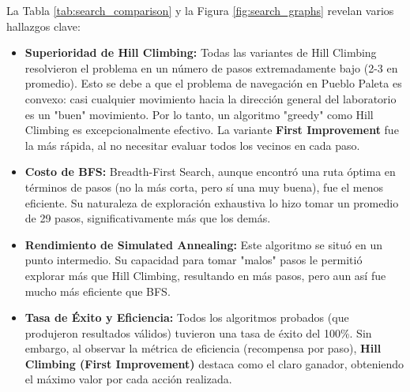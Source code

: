 \documentclass[12pt, oneside, openany]{book}
\begin{document}


La Tabla \ref{tab:search_comparison} y la Figura \ref{fig:search_graphs} revelan varios hallazgos clave:
\begin{itemize}
    \item \textbf{Superioridad de Hill Climbing:} Todas las variantes de Hill Climbing resolvieron el problema en un número de pasos extremadamente bajo (2-3 en promedio). Esto se debe a que el problema de navegación en Pueblo Paleta es convexo: casi cualquier movimiento hacia la dirección general del laboratorio es un "buen" movimiento. Por lo tanto, un algoritmo "greedy" como Hill Climbing es excepcionalmente efectivo. La variante \textbf{First Improvement} fue la más rápida, al no necesitar evaluar todos los vecinos en cada paso.
    \item \textbf{Costo de BFS:} Breadth-First Search, aunque encontró una ruta óptima en términos de pasos (no la más corta, pero sí una muy buena), fue el menos eficiente. Su naturaleza de exploración exhaustiva lo hizo tomar un promedio de 29 pasos, significativamente más que los demás.
    \item \textbf{Rendimiento de Simulated Annealing:} Este algoritmo se situó en un punto intermedio. Su capacidad para tomar "malos" pasos le permitió explorar más que Hill Climbing, resultando en más pasos, pero aun así fue mucho más eficiente que BFS.
    \item \textbf{Tasa de Éxito y Eficiencia:} Todos los algoritmos probados (que produjeron resultados válidos) tuvieron una tasa de éxito del 100\%. Sin embargo, al observar la métrica de eficiencia (recompensa por paso), \textbf{Hill Climbing (First Improvement)} destaca como el claro ganador, obteniendo el máximo valor por cada acción realizada.
\end{itemize}
\end{document}
